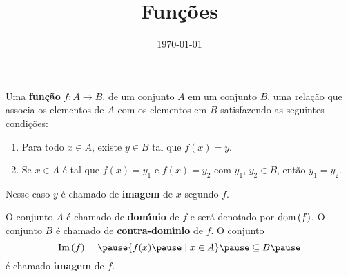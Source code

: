 \documentclass{beamer}
\title{Fun\c{c}\~oes}
\author[\autor]{\autor}
\institute[\instituto]{\instituto}
\date{\today}
\begin{document}
    \begin{frame}
        \maketitle
    \end{frame}


    \begin{frame}
        \begin{definicao}
            Uma \textbf{fun{\c c}{\~a}o} \pause $f : A \to B$, \pause de um conjunto $A$ \pause em um conjunto $B$,  uma rela{\c c}{\~a}o que associa os elementos de $A$ \pause com os elementos em $B$ \pause satisfazendo as seguintes condi\c{c}\~oes:\pause
            \begin{enumerate}[label={\roman*})]
                \item Para todo $x \in A$, \pause existe $y \in B$ \pause tal que $f(x) = y$.\pause

                \vspace{.3cm}

                \item  Se $x \in A$ \pause \'e tal que $f(x) = y_1$ \pause e $f(x) = y_2$ \pause com $y_1$, \pause $y_2 \in B$, \pause ent\~ao $y_1 = y_2$.\pause
            \end{enumerate}
            Nesse caso $y$ \'e chamado de \textbf{imagem} \pause de $x$ segundo $f$.\pause
        \end{definicao}

        O conjunto $A$ {\'e} chamado de \textbf{dom{\'\i}nio} \pause de $f$ \pause e ser\'a denotado por ${\rm dom\,}(f)$. \pause O conjunto $B$ {\'e} chamado de \textbf{contra-dom{\'\i}nio} \pause de $f$. \pause O conjunto\pause
        \[
            \im(f) = \pause \{f(x) \pause \mid x \in A\} \pause \sub B\pause
        \]
        \'e chamado \textbf{imagem} de $f$.\pause
    \end{frame}
\end{document}
